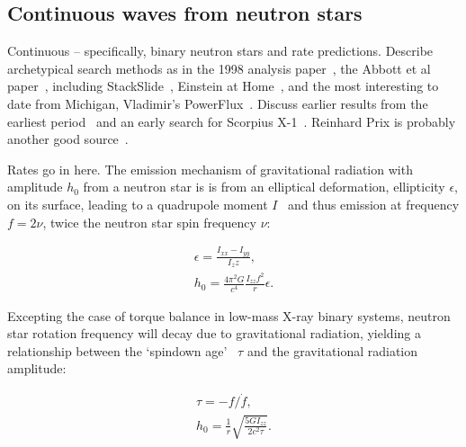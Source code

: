         \subsection{Continuous waves from neutron stars}
        \label{continuous_waves}

            Continuous -- specifically, binary neutron stars and rate predictions. Describe archetypical search methods as in the 1998 analysis paper~\cite{Jaranowski1998}, the Abbott et al paper~\cite{LSCPulsar2006}, including StackSlide~\cite{LSCPulsarS4}, Einstein at Home~\cite{LSCEinsteinHome2009}, and the most interesting to date from Michigan, Vladimir's PowerFlux~\cite{LSCPowerFlux2009}. Discuss earlier results from the earliest period~\cite{Abbott2004} and an early search for Scorpius X-1~\cite{AbbottPulsar2006}. Reinhard Prix is probably another good source~\cite{Prix2006}.

		Rates go in here.
        The emission mechanism of gravitational radiation with amplitude $h_0$ from a neutron star is is from an elliptical deformation, ellipticity $\epsilon$, on its surface, leading to a quadrupole moment $I$~\cite{LSCPulsar2006} and thus emission at frequency $f = 2\nu$, twice the neutron star spin frequency $\nu$:

        \begin{eqnarray}
        \epsilon = \frac{I_{xx} - I_{yy}}{I_zz}, \\
        h_0 = \frac{4 \pi^2 G}{c^4} \frac{I_{zz} f^2}{r} \epsilon.
        \end{eqnarray}

Excepting the case of torque balance in low-mass X-ray binary systems, neutron star rotation frequency will decay due to gravitational radiation, yielding a relationship between the `spindown age'~\cite{Brady1998} $\tau$ and the gravitational radiation amplitude:

        \begin{eqnarray}
        \tau = -f / \dot{f}, \\
        h_0 = \frac{1}{r} \sqrt{\frac{5 G I_{zz}}{2 c^2 \tau}}.
        \end{eqnarray}

